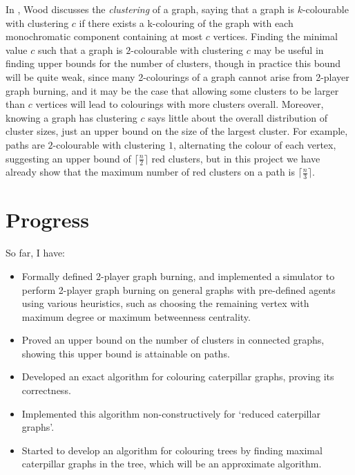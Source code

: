 \documentclass{mprop}
\begin{document}
In \cite{wood_defective_2018}, Wood discusses the \emph{clustering} of a graph, saying that a graph is $k$-colourable with clustering $c$ if there exists a k-colouring of the graph with each monochromatic component containing at most $c$ vertices. Finding the minimal value $c$ such that a graph is $2$-colourable with clustering $c$ may be useful in finding upper bounds for the number of clusters, though in practice this bound will be quite weak, since many 2-colourings of a graph cannot arise from 2-player graph burning, and it may be the case that allowing some clusters to be larger than $c$ vertices will lead to colourings with more clusters overall. Moreover, knowing a graph has clustering $c$ says little about the overall distribution of cluster sizes, just an upper bound on the size of the largest cluster.  For example, paths are $2$-colourable with clustering $1$, alternating the colour of each vertex, suggesting an upper bound of $\lceil \frac{n}{2} \rceil$ red clusters, but in this project we have already show that the maximum number of red clusters on a path is $\lceil \frac{n}{3} \rceil$.


\section{Progress}

So far, I have:

\begin{itemize}
    \item Formally defined 2-player graph burning, and implemented a simulator to perform 2-player graph burning on general graphs with pre-defined agents using various heuristics, such as choosing the remaining vertex with maximum degree or maximum betweenness centrality.
    \item Proved an upper bound on the number of clusters in connected graphs, showing this upper bound is attainable on paths.
    \item Developed an exact algorithm for colouring caterpillar graphs, proving its correctness.
    \item Implemented this algorithm non-constructively for `reduced caterpillar graphs'.
    \item Started to develop an algorithm for colouring trees by finding maximal caterpillar graphs in the tree, which will be an approximate algorithm.
\end{itemize}

\end{document}
